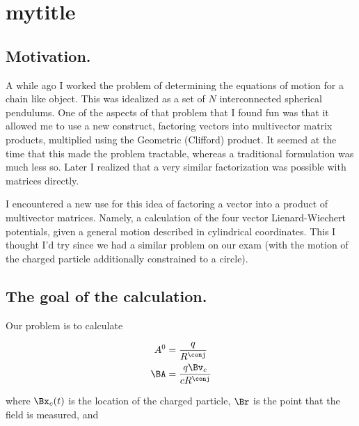 
%

\chapter{mytitle}
\label{chap:matrixVectorPotentials}
{}
\date{April 30, 2011}

\beginArtWithToc

\section{Motivation.}

A while ago I worked the problem of determining the equations of motion for a chain like object.  This was idealized as a set of $N$ interconnected spherical pendulums.  One of the aspects of that problem that I found fun was that it allowed me to use a new construct, factoring vectors into multivector matrix products, multiplied using the Geometric (Clifford) product.  It seemed at the time that this made the problem tractable, whereas a traditional formulation was much less so.  Later I realized that a very similar factorization was possible with matrices directly.

I encountered a new use for this idea of factoring a vector into a product of multivector matrices.  Namely, a calculation of the four vector Lienard-Wiechert potentials, given a general motion described in cylindrical coordinates.  This I thought I'd try since we had a similar problem on our exam (with the motion of the charged particle additionally constrained to a circle).

\section{The goal of the calculation.}

Our problem is to calculate

\begin{align}\label{eqn:matrixVectorPotentials:n}
A^0 &= \frac{q}{R^\conj} \\
\BA &= \frac{q \Bv_c}{c R^\conj}
\end{align}

where $\Bx_c(t)$ is the location of the charged particle, $\Br$ is the point that the field is measured, and 

